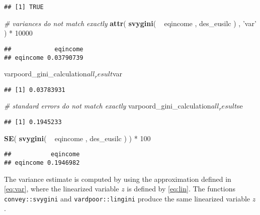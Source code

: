 \documentclass[]{book}
\newenvironment{Shaded}{\begin{snugshade}}{\end{snugshade}}
\newcommand{\KeywordTok}[1]{\textcolor[rgb]{0.13,0.29,0.53}{\textbf{{#1}}}}
\newcommand{\DecValTok}[1]{\textcolor[rgb]{0.00,0.00,0.81}{{#1}}}
\newcommand{\StringTok}[1]{\textcolor[rgb]{0.31,0.60,0.02}{{#1}}}
\newcommand{\CommentTok}[1]{\textcolor[rgb]{0.56,0.35,0.01}{\textit{{#1}}}}
\newcommand{\NormalTok}[1]{{#1}}
\begin{document}
\begin{verbatim}
## [1] TRUE
\end{verbatim}

\begin{Shaded}
\begin{Highlighting}[]
\CommentTok{# variances do not match exactly}
\KeywordTok{attr}\NormalTok{( }\KeywordTok{svygini}\NormalTok{( ~}\StringTok{ }\NormalTok{eqincome , des_eusilc ) , }\StringTok{'var'} \NormalTok{) *}\StringTok{ }\DecValTok{10000}
\end{Highlighting}
\end{Shaded}

\begin{verbatim}
##            eqincome
## eqincome 0.03790739
\end{verbatim}

\begin{Shaded}
\begin{Highlighting}[]
\NormalTok{varpoord_gini_calculation$all_result$var}
\end{Highlighting}
\end{Shaded}

\begin{verbatim}
## [1] 0.03783931
\end{verbatim}

\begin{Shaded}
\begin{Highlighting}[]
\CommentTok{# standard errors do not match exactly}
\NormalTok{varpoord_gini_calculation$all_result$se}
\end{Highlighting}
\end{Shaded}

\begin{verbatim}
## [1] 0.1945233
\end{verbatim}

\begin{Shaded}
\begin{Highlighting}[]
\KeywordTok{SE}\NormalTok{( }\KeywordTok{svygini}\NormalTok{( ~}\StringTok{ }\NormalTok{eqincome , des_eusilc ) ) *}\StringTok{ }\DecValTok{100}
\end{Highlighting}
\end{Shaded}

\begin{verbatim}
##           eqincome
## eqincome 0.1946982
\end{verbatim}

The variance estimate is computed by using the approximation defined in
\eqref{eq:var}, where the linearized variable \(z\) is defined by
\eqref{eq:lin}. The functions \texttt{convey::svygini} and
\texttt{vardpoor::lingini} produce the same linearized variable \(z\).
\end{document}
